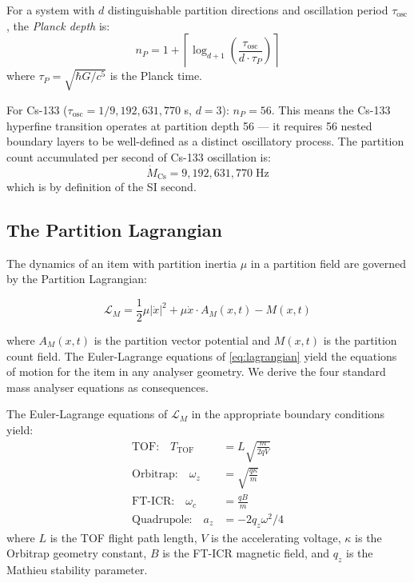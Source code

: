 \begin{definition}
\label{def:planck_depth}
For a system with $d$ distinguishable partition directions and oscillation
period $\tau_{\mathrm{osc}}$, the \emph{Planck depth} is:
\begin{equation}
    n_P = 1 + \left\lceil \log_{d+1} \left( \frac{\tau_{\mathrm{osc}}}{d \cdot
    \tau_P} \right) \right\rceil
    \label{eq:planck_depth}
\end{equation}
where $\tau_P = \sqrt{\hbar G / c^5}$ is the Planck time.
\end{definition}

For Cs-133 ($\tau_{\mathrm{osc}} = 1/9{,}192{,}631{,}770$ s, $d = 3$): $n_P = 56$.
This means the Cs-133 hyperfine transition operates at partition depth 56 --- it
requires 56 nested boundary layers to be well-defined as a distinct oscillatory
process. The partition count accumulated per second of Cs-133 oscillation is:
\begin{equation}
    \dot{M}_{\mathrm{Cs}} = 9{,}192{,}631{,}770 \;\mathrm{Hz}
    \label{eq:cs_mdot}
\end{equation}
which is by definition of the SI second.

\subsection{The Partition Lagrangian}
\label{subsec:lagrangian}

The dynamics of an item with partition inertia $\mu$ in a partition field are
governed by the Partition Lagrangian:

\begin{equation}
    \mathcal{L}_M = \frac{1}{2}\mu|\dot{x}|^2 + \mu\dot{x} \cdot A_M(x,t)
    - M(x,t)
    \label{eq:lagrangian}
\end{equation}

where $A_M(x,t)$ is the partition vector potential and $M(x,t)$ is the
partition count field. The Euler-Lagrange equations of
\eqref{eq:lagrangian} yield the equations of motion for the item in any
analyser geometry. We derive the four standard mass analyser equations as
consequences.

\begin{theorem}
\label{thm:four_analysers}
The Euler-Lagrange equations of $\mathcal{L}_M$ in the appropriate boundary
conditions yield:
\begin{align}
    \text{TOF:} \quad T_{\mathrm{TOF}} &= L\sqrt{\frac{m}{2qV}}
    \label{eq:tof} \\
    \text{Orbitrap:} \quad \omega_z &= \sqrt{\frac{q\kappa}{m}}
    \label{eq:orbitrap} \\
    \text{FT-ICR:} \quad \omega_c &= \frac{qB}{m}
    \label{eq:fticr} \\
    \text{Quadrupole:} \quad a_z &= -2q_z \omega^2 / 4
    \label{eq:quad}
\end{align}
where $L$ is the TOF flight path length, $V$ is the accelerating voltage,
$\kappa$ is the Orbitrap geometry constant, $B$ is the FT-ICR magnetic field,
and $q_z$ is the Mathieu stability parameter.
\end{theorem}

